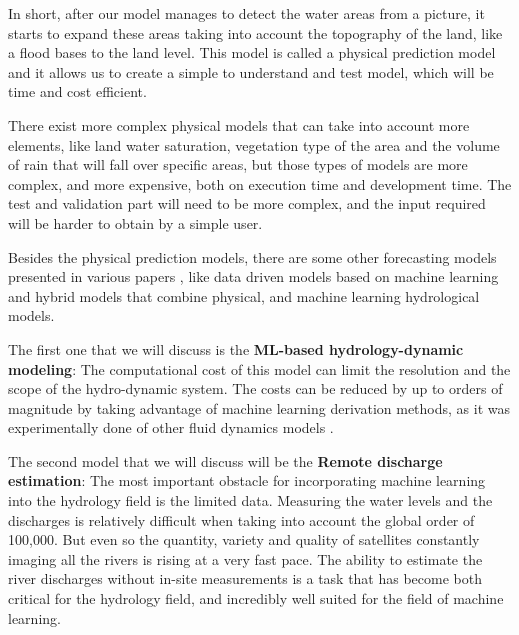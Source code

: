 \documentclass[12pt, a4paper]{report}
\begin{document}
In short, after our model manages to detect the water areas from a picture, it starts to expand these areas taking into account the topography of the land, like a flood bases to the land level. This model is called a physical prediction model and it allows us to create a simple to understand and test model, which will be time and cost efficient. 
\par 

There exist more complex physical models that can take into account more elements, like land water saturation, vegetation type of the area and the volume of rain that will fall over specific areas, but those types of models are more complex, and more expensive, both on execution time and development time. The test and validation part will need to be more complex, and the input required will be harder to obtain by a simple user. 
\par 

Besides the physical prediction models, there are some other forecasting models presented in various papers \cite{Flood forecasting models}, like data driven models based on machine learning and hybrid models that combine physical, and machine learning hydrological models.\par 

The first one that we will discuss is the \textbf{ML-based hydrology-dynamic modeling}: The computational cost of this model can limit the resolution and the scope of the hydro-dynamic system. The costs can be reduced by up to orders of magnitude by taking advantage of machine learning derivation methods, as it was experimentally done of other fluid dynamics models \cite{Yohai}.
\par 

The second model that we will discuss will be the \textbf{Remote discharge estimation}: The most important obstacle for incorporating machine learning into the hydrology field is the limited data. Measuring the water levels and the discharges is relatively difficult when taking into account the global order of 100,000. But even so the quantity, variety and quality of satellites constantly imaging all the rivers is rising at a very fast pace. The ability to estimate the river discharges without in-site measurements is a task that has become both critical for the hydrology field, and incredibly well suited for the field of machine learning.
\par 
\end{document}
